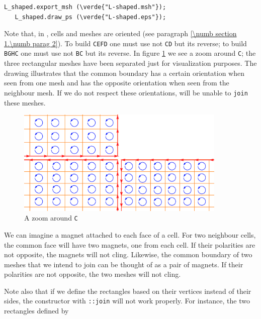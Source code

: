 \begin{Verbatim}[commandchars=\\\{\},formatcom=\small\tt,baselinestretch=0.94]
   L_shaped.export_msh (\verde{"L-shaped.msh"});
   L_shaped.draw_ps (\verde{"L-shaped.eps"});
\end{Verbatim}

Note that, in \maniFEM, cells and meshes are oriented
(see paragraph \ref{\numb section 1.\numb parag 2}).
To build {\small\tt CEFD} one must use not {\small\tt CD} but its reverse;
to build {\small\tt BGHC} one must use not {\small\tt BC} but its reverse.
In figure \ref{\numb section 1.\numb fig 6} we see a zoom around {\small\tt C};
the three rectangular meshes have been separated just for visualization purposes.
The drawing illustrates that the common boundary has a certain orientation when seen
from one mesh and has the opposite orientation when seen from the neighbour mesh.
If we do not respect these orientations, {\maniFEM} will be unable to {\small\tt join}
these meshes.

\begin{figure}[ht]  \centering
  \includegraphics[width=100mm]{L-crack}
  \caption{A zoom around {\small\tt C}}
  \label{\numb section 1.\numb fig 6}
\end{figure}

We can imagine a magnet attached to each face of a cell.
For two neighbour cells, the common face will have two magnets, one from each cell.
If their polarities are not opposite, the magnets will not cling.
Likewise, the common boundary of two meshes that we intend to join can be thought of
as a pair of magnets.
If their polarities are not opposite, the two meshes will not cling.

Note also that if we define the rectangles based on their vertices instead of their sides, 
the {\small\tt {}} constructor with {\small\tt {}::join} will not work properly. 
For instance, the two rectangles defined by

